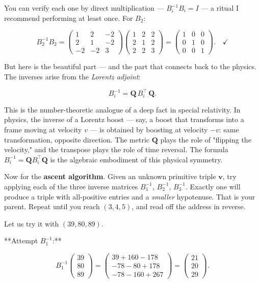 You can verify each one by direct multiplication --- $B_i^{-1} B_i = I$ --- a ritual I recommend performing at least once. For $B_2$:

\[
B_2^{-1} B_2 = \begin{pmatrix} 1 & 2 & -2 \\ 2 & 1 & -2 \\ -2 & -2 & 3 \end{pmatrix} \begin{pmatrix} 1 & 2 & 2 \\ 2 & 1 & 2 \\ 2 & 2 & 3 \end{pmatrix} = \begin{pmatrix} 1 & 0 & 0 \\ 0 & 1 & 0 \\ 0 & 0 & 1 \end{pmatrix}. \quad \checkmark
\]

But here is the beautiful part --- and the part that connects back to the physics. The inverses arise from the \textit{Lorentz adjoint}:

\[
B_i^{-1} = \mathbf{Q} \, B_i^\top \, \mathbf{Q}.
\]

This is the number-theoretic analogue of a deep fact in special relativity. In physics, the inverse of a Lorentz boost --- say, a boost that transforms into a frame moving at velocity $v$ --- is obtained by boosting at velocity $-v$: same transformation, opposite direction. The metric $\mathbf{Q}$ plays the role of "flipping the velocity," and the transpose plays the role of time reversal. The formula $B_i^{-1} = \mathbf{Q} B_i^\top \mathbf{Q}$ is the algebraic embodiment of this physical symmetry.

Now for the \textbf{ascent algorithm}. Given an unknown primitive triple $\mathbf{v}$, try applying each of the three inverse matrices $B_1^{-1}$, $B_2^{-1}$, $B_3^{-1}$. Exactly one will produce a triple with all-positive entries and a \textit{smaller} hypotenuse. That is your parent. Repeat until you reach $(3, 4, 5)$, and read off the address in reverse.

Let us try it with $(39, 80, 89)$.

**Attempt $B_1^{-1}$:**

\[
B_1^{-1} \begin{pmatrix} 39 \\ 80 \\ 89 \end{pmatrix} = \begin{pmatrix} 39 + 160 - 178 \\ -78 - 80 + 178 \\ -78 - 160 + 267 \end{pmatrix} = \begin{pmatrix} 21 \\ 20 \\ 29 \end{pmatrix}.
\]

